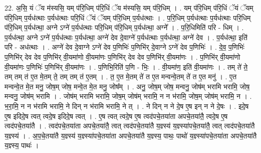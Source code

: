 \documentclass[17pt]{extarticle}
\begin{document}
22. अ॒सि॒ यं ॅय म॑स्यसि॒ यम् प॑रि॒धिम् प॑रि॒धिं ॅय म॑स्यसि॒ यम् प॑रि॒धिम् । . यम् प॑रि॒धिम् प॑रि॒धिं ॅयं ॅयम् प॑रि॒धिम् प॒र्यध॑त्थाः प॒र्यध॑त्थाः परि॒धिं ॅयं ॅयम् प॑रि॒धिम् प॒र्यध॑त्थाः । . प॒रि॒धिम् प॒र्यध॑त्थाः प॒र्यध॑त्थाः परि॒धिम् प॑रि॒धिम् प॒र्यध॑त्था॒ अग्ने ऽग्ने॑ प॒र्यध॑त्थाः परि॒धिम् प॑रि॒धिम् प॒र्यध॑त्था॒ अग्ने᳚ । . प॒रि॒धिमिति॑ परि - धिम् । . प॒र्यध॑त्था॒ अग्ने ऽग्ने॑ प॒र्यध॑त्थाः प॒र्यध॑त्था॒ अग्ने॑ देव दे॒वाग्ने॑ प॒र्यध॑त्थाः प॒र्यध॑त्था॒ अग्ने॑ देव । . प॒र्यध॑त्था॒ इति॑ परि - अध॑त्थाः । . अग्ने॑ देव दे॒वाग्ने ऽग्ने॑ देव प॒णिभिः॑ प॒णिभि॑र् दे॒वाग्ने ऽग्ने॑ देव प॒णिभिः॑ । . दे॒व॒ प॒णिभिः॑ प॒णिभि॑र् देव देव प॒णिभि॑र् वी॒यमा॑णो वी॒यमा॑णः प॒णिभि॑र् देव देव प॒णिभि॑र् वी॒यमा॑णः । . प॒णिभि॑र् वी॒यमा॑णो वी॒यमा॑णः प॒णिभिः॑ प॒णिभि॑र् वी॒यमा॑णः । . प॒णिभि॒रिति॑ प॒णि - भिः॒ । . वी॒यमा॑ण॒ इति॑ वी॒यमा॑णः । . तम् ते॑ ते॒ तम् तम् त॑ ए॒त मे॒तम् ते॒ तम् तम् त॑ ए॒तम् । . त॒ ए॒त मे॒तम् ते॑ त ए॒त मन्वन्वे॒तम् ते॑ त ए॒त मनु॑ । . ए॒त मन्वन्वे॒त मे॒त मनु॒ जोष॒म् जोष॒ मन्वे॒त मे॒त मनु॒ जोष᳚म् । . अनु॒ जोष॒म् जोष॒ मन्वनु॒ जोष॑म् भरामि भरामि॒ जोष॒ मन्वनु॒ जोष॑म् भरामि । . जोष॑म् भरामि भरामि॒ जोष॒म् जोष॑म् भरामि॒ न न भ॑रामि॒ जोष॒म् जोष॑म् भरामि॒ न । . भ॒रा॒मि॒ न न भ॑रामि भरामि॒ ने दिन् न भ॑रामि भरामि॒ ने त् । . ने दिन् न ने दे॒ष ए॒ष इन् न ने दे॒षः । . इदे॒ष ए॒ष इदिदे॒ष त्वत् त्वदे॒ष इदिदे॒ष त्वत् । . ए॒ष त्वत् त्वदे॒ष ए॒ष त्वद॑पचे॒तया॑ता अपचे॒तया॑तै॒ त्वदे॒ष ए॒ष त्वद॑पचे॒तया॑तै । . त्वद॑पचे॒तया॑ता अपचे॒तया॑तै॒ त्वत् त्वद॑पचे॒तया॑तै य॒ज्ञ्स्य॑ य॒ज्ञ्स्या॑पचे॒तया॑तै॒ त्वत् त्वद॑पचे॒तया॑तै य॒ज्ञ्स्य॑ । . अ॒प॒चे॒तया॑तै य॒ज्ञ्स्य॑ य॒ज्ञ्स्या॑पचे॒तया॑ता अपचे॒तया॑तै य॒ज्ञ्स्य॒ पाथः॒ पाथो॑ य॒ज्ञ्स्या॑पचे॒तया॑ता अपचे॒तया॑तै य॒ज्ञ्स्य॒ पाथः॑ । \newline
\end{document}
